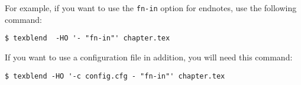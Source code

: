 For example, if you want to use the \verb|fn-in| option for endnotes, use the following command:

\begin{verbatim}
$ texblend  -HO '- "fn-in"' chapter.tex
\end{verbatim}

If you want to use a configuration file in addition, you will need this command:

\begin{verbatim}
$ texblend -HO '-c config.cfg - "fn-in"' chapter.tex
\end{verbatim}
